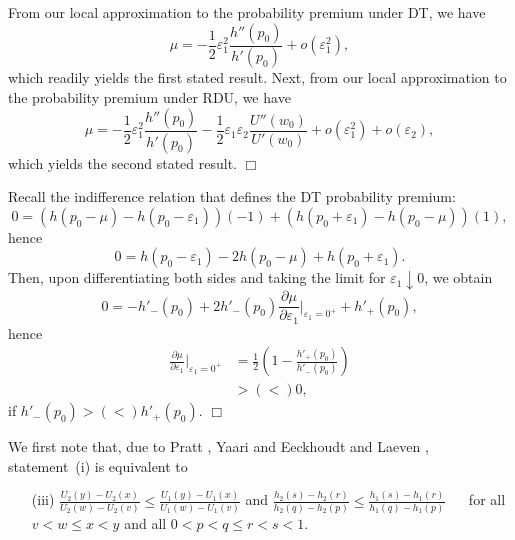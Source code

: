 \documentclass[11pt]{article}
\def\qed{\unskip\nobreak\hfill$\Box$\par\addvspace{\medskipamount}}
\begin{document}
\begin{appendices}
From our local approximation to the probability premium under DT,
we have
\begin{equation*}
\mu=-\frac{1}{2}\varepsilon_{1}^{2}\frac{h''(p_{0})}{h'(p_{0})}+o(\varepsilon_{1}^{2}),
\end{equation*}
which readily yields the first stated result.
Next, from our local approximation to the probability premium under RDU,
we have 
\begin{equation*}
\mu=-\frac{1}{2}\varepsilon_{1}^{2}\frac{h''(p_{0})}{h'(p_{0})}-\frac{1}{2}\varepsilon_{1}\varepsilon_{2}\frac{U''(w_{0})}{U'(w_{0})}
+o(\varepsilon_{1}^{2})+o(\varepsilon_{2}),
\end{equation*}
which yields the second stated result.
\qed

Recall the indifference relation that defines the DT probability premium:
\begin{equation*}
0=\left(h(p_{0}-\mu)-h(p_{0}-\varepsilon_{1})\right)\left(-1\right)+\left(h(p_{0}+\varepsilon_{1})-h(p_{0}-\mu)\right)\left(1\right),
\end{equation*}
hence
\begin{equation*}
0=h(p_{0}-\varepsilon_{1})-2h(p_{0}-\mu)+h(p_{0}+\varepsilon_{1}).
\end{equation*}
Then, upon differentiating both sides and taking the limit for $\varepsilon_{1}\downarrow 0$, we obtain
\begin{equation*}
0=-h'_{-}(p_{0})+2h'_{-}(p_{0})\frac{\partial \mu}{\partial \varepsilon_{1}}\Big|_{\varepsilon_{1}=0^{+}}+h'_{+}(p_{0}),
\end{equation*}
hence
\begin{align*}
\frac{\partial \mu}{\partial \varepsilon_{1}}\Big|_{\varepsilon_{1}=0^{+}}&=\frac{1}{2}\left(1-\frac{h'_{+}(p_{0})}{h'_{-}(p_{0})}\right)\\
&>(<)0,
\end{align*}
if $h'_{-}(p_{0})>(<) h'_{+}(p_{0})$.
\qed

We first note that, due to Pratt \cite{P64}, Yaari \cite{Y86} and Eeckhoudt and Laeven \cite{EL20},
statement~(i) is equivalent to
\begin{itemize}
\item[(iii)] $\frac{U_{2}(y)-U_{2}(x)}{U_{2}(w)-U_{2}(v)}\leq \frac{U_{1}(y)-U_{1}(x)}{U_{1}(w)-U_{1}(v)}$
and
$\frac{h_{2}(s)-h_{2}(r)}{h_{2}(q)-h_{2}(p)}\leq \frac{h_{1}(s)-h_{1}(r)}{h_{1}(q)-h_{1}(p)}$
$\quad$ for all $v<w\leq x<y$ and all $0<p<q\leq r<s<1$.
\end{itemize}


\end{appendices}
\end{document}
